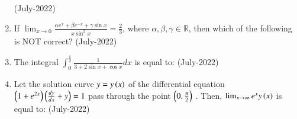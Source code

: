 \documentclass[journal]{IEEEtran}
\begin{document}
\begin{enumerate}
 \hfill(July-2022)
 \begin{enumerate}
 \end{enumerate}
 \item If $\lim_{x\to 0} \frac{\alpha e^x + \beta e^{-x} + \gamma \sin{x}}{x \sin ^2 x} = \frac{2}{3}$, where $\alpha, \beta, \gamma \in \mathbb{R}$, then which of the following is NOT correct? \hfill (July-2022)
 \begin{enumerate}
 \end{enumerate}
 \item The integral $\int_0^{\frac{\pi}{2}} \frac{1}{3 + 2 \sin{x} + \cos{x}}dx$ is equal to: \hfill (July-2022)
 \begin{enumerate}
 \end{enumerate}
 \item Let the solution curve $y = y\left(x\right)$
 of the differential equation $\left(1 + e^{2x}\right)\left(\frac{dy}{dx} + y\right) = 1$
 pass through the point $\left(0,\frac{\pi}{2}\right)$ 
. Then,  $\lim_{x \to \infty} e^x y\left(x\right)$ is equal to: \hfill(July-2022)
\begin{enumerate}
\end{enumerate}
\end{enumerate}
\end{document}
